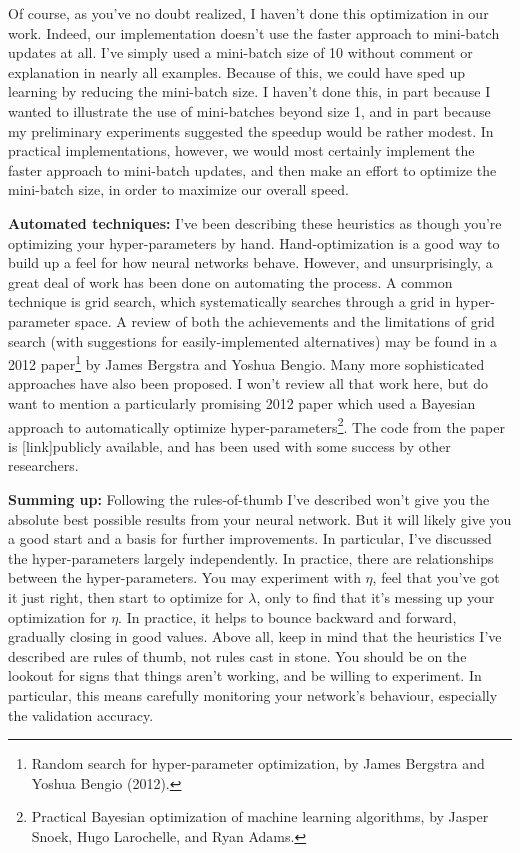 \documentclass[a4paper,twoside,10pt]{book}
\begin{document}
Of course, as you've no doubt realized, I haven't done this optimization in our work. Indeed, our implementation doesn't use the faster approach to mini-batch updates at all. I've simply used a mini-batch size of 10 without comment or explanation in nearly all examples. Because of this, we could have sped up learning by reducing the mini-batch size. I haven't done this, in part because I wanted to illustrate the use of mini-batches beyond size 1, and in part because my preliminary experiments suggested the speedup would be rather modest. In practical implementations, however, we would most certainly implement the faster approach to mini-batch updates, and then make an effort to optimize the mini-batch size, in order to maximize our overall speed.

\textbf{Automated techniques:} I've been describing these heuristics as though you're optimizing your hyper-parameters by hand. Hand-optimization is a good way to build up a feel for how neural networks behave. However, and unsurprisingly, a great deal of work has been done on automating the process. A common technique is grid search, which systematically searches through a grid in hyper-parameter space. A review of both the achievements and the limitations of grid search (with suggestions for easily-implemented alternatives) may be found in a 2012 paper\footnote{Random search for hyper-parameter optimization, by James Bergstra and Yoshua Bengio (2012).} by James Bergstra and Yoshua Bengio. Many more sophisticated approaches have also been proposed. I won't review all that work here, but do want to mention a particularly promising 2012 paper which used a Bayesian approach to automatically optimize hyper-parameters\footnote{Practical Bayesian optimization of machine learning algorithms, by Jasper Snoek, Hugo Larochelle, and Ryan Adams.}. The code from the paper is [link]publicly available, and has been used with some success by other researchers.

\textbf{Summing up:} Following the rules-of-thumb I've described won't give you the absolute best possible results from your neural network. But it will likely give you a good start and a basis for further improvements. In particular, I've discussed the hyper-parameters largely independently. In practice, there are relationships between the hyper-parameters. You may experiment with $\eta$, feel that you've got it just right, then start to optimize for $\lambda$, only to find that it's messing up your optimization for $\eta$. In practice, it helps to bounce backward and forward, gradually closing in good values. Above all, keep in mind that the heuristics I've described are rules of thumb, not rules cast in stone. You should be on the lookout for signs that things aren't working, and be willing to experiment. In particular, this means carefully monitoring your network's behaviour, especially the validation accuracy.
\end{document}
